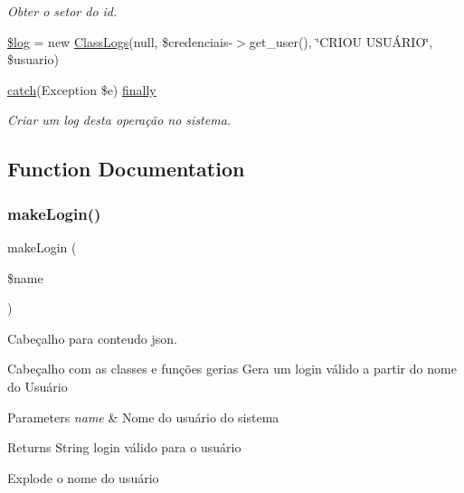\begin{DoxyCompactItemize}
\begin{DoxyCompactList}\small\item\em Obter o setor do id. \end{DoxyCompactList}\item 
\hyperlink{menu_2configuracoes_2usuarios_2new_8php_a9a2cf15a653aee8be437f7ae474cd494}{\$log} = new \hyperlink{class_class_logs}{Class\+Logs}(null, \$credenciais-\/$>$get\+\_\+user(), \char`\"{}C\+R\+I\+OU U\+S\+UÁ\+R\+IO\char`\"{}, \$usuario)
\item 
\hyperlink{imprimir_2ficha_2index_8php_a8104793004944f01dd070fc8b1ade3c4}{catch}(Exception \$e) \hyperlink{menu_2configuracoes_2usuarios_2new_8php_a1eb47d68a4a4f73debf91b15e179d813}{finally}
\begin{DoxyCompactList}\small\item\em Criar um log desta operação no sistema. \end{DoxyCompactList}\end{DoxyCompactItemize}


\subsection{Function Documentation}
\mbox{\label{menu_2configuracoes_2usuarios_2new_8php_a02b1567052c09d3f736df3ae05496307}} 
\subsubsection{\texorpdfstring{make\+Login()}{makeLogin()}}
{\footnotesize\ttfamily make\+Login (\begin{DoxyParamCaption}\item[{}]{\$name }\end{DoxyParamCaption})}



Cabeçalho para conteudo json. 

Cabeçalho com as classes e funções gerias Gera um login válido a partir do nome do Usuário


\begin{DoxyParams}{Parameters}
{\em name} & Nome do usuário do sistema \\
\hline
\end{DoxyParams}
\begin{DoxyReturn}{Returns}
String login válido para o usuário 
\end{DoxyReturn}
Explode o nome do usuário

